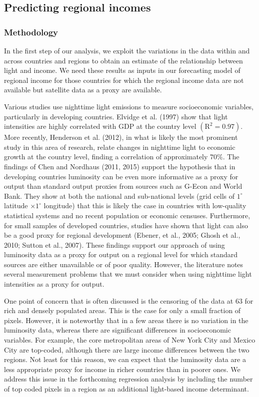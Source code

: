 \documentclass[10pt]{article}
\begin{document}
\subsection{Predicting regional incomes}

\subsubsection{Methodology}
In the first step of our analysis, we exploit the variations in the data within and across countries and regions to obtain an estimate of the relationship between light and income. We need these results as inputs in our forecasting model of regional income for those countries for which the regional income data are not available but satellite data as a proxy are available.

Various studies use nighttime light emissions to measure socioeconomic variables, particularly in developing countries. Elvidge et al. (1997) show that light intensities are highly correlated with GDP at the country level $\left(\mathrm{R}^{2}=0.97\right)$. More recently, Henderson et al. (2012), in what is likely the most prominent study in this area of research, relate changes in nighttime light to economic growth at the country level, finding a correlation of approximately $70 \%$. The findings of Chen and Nordhaus (2011, 2015) support the hypothesis that in developing countries luminosity can be even more informative as a proxy for output than standard output proxies from sources such as G-Econ and World Bank. They show at both the national and sub-national levels (grid cells of $1^{\circ}$ latitude $\times 1^{\circ}$ longitude) that this is likely the case in countries with low-quality statistical systems and no recent population or economic censuses. Furthermore, for small samples of developed countries, studies have shown that light can also be a good proxy for regional development (Ebener, et al., 2005; Ghosh et al., 2010; Sutton et al., 2007). These findings support our approach of using luminosity data as a proxy for output on a regional level for which standard sources are either unavailable or of poor quality. However, the literature notes several measurement problems that we must consider when using nighttime light intensities as a proxy for output.

One point of concern that is often discussed is the censoring of the data at 63 for rich and densely populated areas. This is the case for only a small fraction of pixels. However, it is noteworthy that in a few areas there is no variation in the luminosity data, whereas there are significant differences in socioeconomic variables. For example, the core metropolitan areas of New York City and Mexico City are top-coded, although there are large income differences between the two regions. Not least for this reason, we can expect that the luminosity data are a less appropriate proxy for income in richer countries than in poorer ones. We address this issue in the forthcoming regression analysis by including the number of top coded pixels in a region as an additional light-based income determinant.
\end{document}
